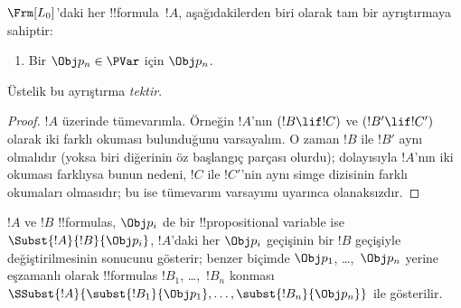 \documentclass[../../../include/open-logic-section]{subfiles}
\begin{document}
\begin{prop}
$\Frm[L_0]$'daki her !!{formula}~$!A$, aşağıdakilerden biri olarak tam bir
ayrıştırmaya sahiptir:
\begin{enumerate}


\item Bir $\Obj p_n \in \PVar$ için $\Obj p_n$.
  




\end{enumerate}
Üstelik bu ayrıştırma \emph{tektir}.
\end{prop}

\begin{proof}
$!A$ üzerinde tümevarımla. Örneğin $!A$'nın $(!B \lif !C)$ ve
$(!B' \lif !C')$ olarak iki farklı okuması bulunduğunu varsayalım. O zaman
$!B$ ile $!B'$ aynı olmalıdır (yoksa biri diğerinin öz başlangıç parçası
olurdu); dolayısıyla $!A$'nın iki okuması farklıysa bunun nedeni, $!C$ ile
$!C'$'nin aynı simge dizisinin farklı okumaları olmasıdır; bu ise tümevarım
varsayımı uyarınca olanaksızdır.
\end{proof}


\begin{defn}
$!A$ ve $!B$ !!{formula}s, $\Obj p_i$ de bir !!{propositional
variable}
ise $\Subst{!A}{!B}{\Obj p_i}$, $!A$'daki her $\Obj p_i$ geçişinin bir $!B$
geçişiyle değiştirilmesinin sonucunu gösterir; benzer biçimde $\Obj p_1$,
\dots,~$\Obj p_n$ yerine eşzamanlı olarak !!{formula}s $!B_1$,
\dots,~$!B_n$ konması
$\SSubst{!A}{\subst{!B_1}{\Obj p_1},\dots,\subst{!B_n}{\Obj p_n}}$
ile gösterilir.
\end{defn}
\end{document}

